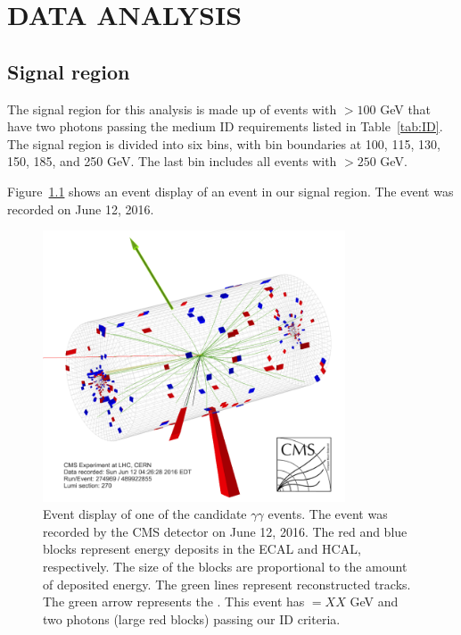 \chapter{DATA ANALYSIS}
\label{chap:DataAnalysis}

\section{Signal region}
The signal region for this analysis is made up of events with \ETmiss $> 100$ GeV that have two photons passing the medium ID requirements listed in Table~\ref{tab:ID}. The signal region is divided into six \ETmiss bins, with bin boundaries at 100, 115, 130, 150, 185, and 250 GeV. The last bin includes all events with \ETmiss $> 250$ GeV. 

Figure~\ref{fig:eventDisplay} shows an event display of an event in our signal region. The event was recorded on June 12, 2016. 

\begin{figure}[h]
\begin{center}
\includegraphics[width=0.8\textwidth]{Figures/DataAnalysis/eventDisplay.png}
\end{center}
\caption{Event display of one of the candidate $\gamma\gamma$ events. The event was recorded by the CMS detector on June 12, 2016. The red and blue blocks represent energy deposits in the ECAL and HCAL, respectively. The size of the blocks are proportional to the amount of deposited energy. The green lines represent reconstructed tracks. The green arrow represents the \ETmiss. This event has \ETmiss $ = XX$ GeV and two photons (large red blocks) passing our ID criteria. }
\label{fig:eventDisplay}
\end{figure}


